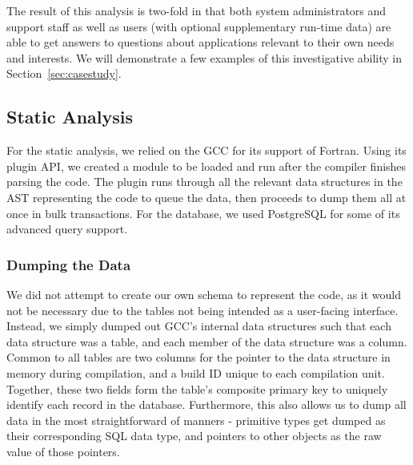 The result of this analysis is two-fold in that both system administrators and support staff as well as users (with optional supplementary run-time data) are able to get answers to questions about applications relevant to their own needs and interests.
We will demonstrate a few examples of this investigative ability in Section~\ref{sec:casestudy}.

\subsection{Static Analysis}
For the static analysis, we relied on the \ac{GCC} for its support of Fortran.
Using its plugin \acs{API}, we created a module to be loaded and run after the compiler finishes parsing the code.
The plugin runs through all the relevant data structures in the \ac{AST} representing the code to queue the data, then proceeds to dump them all at once in bulk transactions.
For the database, we used PostgreSQL for some of its advanced query support.
\subsubsection{Dumping the Data}
We did not attempt to create our own schema to represent the code, as it would not be necessary due to the tables not being intended as a user-facing interface.
Instead, we simply dumped out \ac{GCC}'s internal data structures such that each data structure was a table, and each member of the data structure was a column.
Common to all tables are two columns for the pointer to the data structure in memory during compilation, and a build ID unique to each compilation unit.
Together, these two fields form the table's composite primary key to uniquely identify each record in the database.
Furthermore, this also allows us to dump all data in the most straightforward of manners - primitive types get dumped as their corresponding \acs{SQL} data type, and pointers to other objects as the raw value of those pointers.

